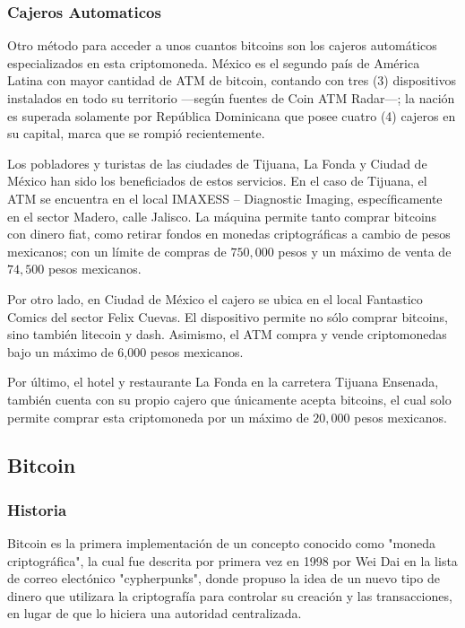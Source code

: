 \documentclass[12pt,letterpaper]{article}
\begin{document}
\subsubsection*{Cajeros Automaticos}
Otro m\'etodo para acceder a unos cuantos bitcoins son los cajeros autom\'aticos especializados en esta criptomoneda. M\'exico es el segundo pa\'is de Am\'erica Latina con mayor cantidad de ATM de bitcoin, contando con tres (3) dispositivos instalados en todo su territorio —seg\'un fuentes de Coin ATM Radar—; la naci\'on es superada solamente por Rep\'ublica Dominicana que posee cuatro (4) cajeros en su capital, marca que se rompi\'o recientemente.

Los pobladores y turistas de las ciudades de Tijuana, La Fonda y Ciudad de M\'exico han sido los beneficiados de estos servicios. En el caso de Tijuana, el ATM se encuentra en el local IMAXESS – Diagnostic Imaging, espec\'ificamente en el sector Madero, calle Jalisco. La m\'aquina permite tanto comprar bitcoins con dinero fiat, como retirar fondos en monedas criptogr\'aficas a cambio de pesos mexicanos; con un l\'imite de compras de $750,000$ pesos y un m\'aximo de venta de $74,500$ pesos mexicanos.

Por otro lado, en Ciudad de M\'exico el cajero se ubica en el local Fantastico Comics del sector Felix Cuevas. El dispositivo permite no s\'olo comprar bitcoins, sino tambi\'en litecoin y dash. Asimismo, el ATM compra y vende criptomonedas bajo un m\'aximo de 6,000 pesos mexicanos.

Por \'ultimo, el hotel y restaurante La Fonda en la carretera Tijuana Ensenada, tambi\'en cuenta con su propio cajero que \'unicamente acepta bitcoins, el cual solo permite comprar esta criptomoneda por un m\'aximo de $20,000$ pesos mexicanos.
	\subsection*{Bitcoin}
        \subsubsection*{Historia}
Bitcoin es la primera implementaci\'on de un concepto conocido como "moneda criptogr\'afica", la cual fue descrita por primera vez en 1998 por Wei Dai en la lista de correo elect\'onico "cypherpunks", donde propuso la idea de un nuevo tipo de dinero que utilizara la criptograf\'ia para controlar su creaci\'on y las transacciones, en lugar de que lo hiciera una autoridad centralizada.
\end{document}
